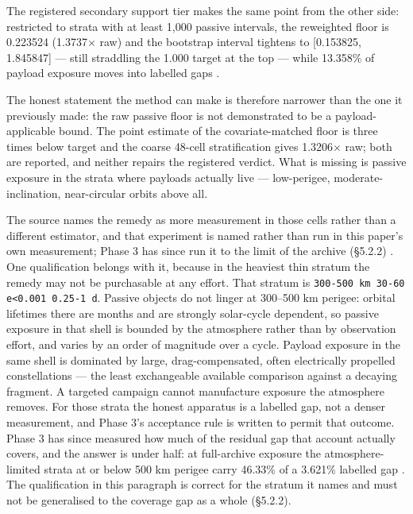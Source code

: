 \documentclass[11pt]{article}
\begin{document}
The registered secondary support tier makes the same point from the other side: restricted to strata with at least 1,000 passive intervals, the reweighted floor is 0.223524 (1.3737$\times$ raw) and the bootstrap interval tightens to [0.153825, 1.845847] --- still straddling the 1.000 target at the top --- while 13.358\% of payload exposure moves into labelled gaps%
.

The honest statement the method can make is therefore narrower than the one it previously made: the raw passive floor is not demonstrated to be a payload-applicable bound. The point estimate of the covariate-matched floor is three times below target and the coarse 48-cell stratification gives 1.3206$\times$ raw; both are reported, and neither repairs the registered verdict. What is missing is passive exposure in the strata where payloads actually live --- low-perigee, moderate-inclination, near-circular orbits above all.

The source names the remedy as more measurement in those cells rather than a different estimator, and that experiment is named rather than run in this paper's own measurement; Phase 3 has since run it to the limit of the archive (\S{}5.2.2)%
. One qualification belongs with it, because in the heaviest thin stratum the remedy may not be purchasable at any effort. That stratum is \texttt{300-500 km \textbar{} 30-60\textdegree{} \textbar{} e\textless{}0.001 \textbar{} 0.25-1 d}. Passive objects do not linger at 300--500 km perigee: orbital lifetimes there are months and are strongly solar-cycle dependent, so passive exposure in that shell is bounded by the atmosphere rather than by observation effort, and varies by an order of magnitude over a cycle. Payload exposure in the same shell is dominated by large, drag-compensated, often electrically propelled constellations --- the least exchangeable available comparison against a decaying fragment. A targeted campaign cannot manufacture exposure the atmosphere removes. For those strata the honest apparatus is a labelled gap, not a denser measurement, and Phase 3's acceptance rule is written to permit that outcome. Phase 3 has since measured how much of the residual gap that account actually covers, and the answer is under half: at full-archive exposure the atmosphere-limited strata at or below 500 km perigee carry 46.33\% of a 3.621\% labelled gap%
. The qualification in this paragraph is correct for the stratum it names and must not be generalised to the coverage gap as a whole (\S{}5.2.2).
\end{document}
